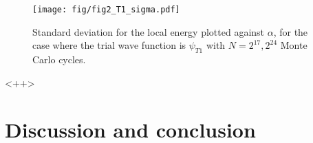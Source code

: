 \documentclass[a4paper,11pt]{article}
\begin{document}
\begin{figure}[htpb]
    \centering
    \texttt{[image: fig/fig2\_T1\_sigma.pdf]}
    \caption{Standard deviation for the local energy plotted against $\alpha$, for the case where the trial wave function is $\psi_{T1}$ with $N=2^{17}, 2^{24}$ Monte Carlo cycles. }
    \label{fig:2_t1_17_sigma}
\end{figure}<++>

\section{Discussion and conclusion}





\end{document}
